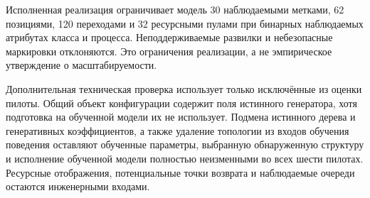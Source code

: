 Исполненная реализация ограничивает модель 30 наблюдаемыми метками, 62 позициями, 120 переходами и 32 ресурсными пулами при бинарных наблюдаемых атрибутах класса и процесса. Неподдерживаемые развилки и небезопасные маркировки отклоняются. Это ограничения реализации, а не эмпирическое утверждение о масштабируемости.

Дополнительная техническая проверка использует только исключённые из оценки пилоты. Общий объект конфигурации содержит поля истинного генератора, хотя подготовка на обученной модели их не использует. Подмена истинного дерева и генеративных коэффициентов, а также удаление топологии из входов обучения поведения оставляют обученные параметры, выбранную обнаруженную структуру и исполнение обученной модели полностью неизменными во всех шести пилотах. Ресурсные отображения, потенциальные точки возврата и наблюдаемые очереди остаются инженерными входами.

